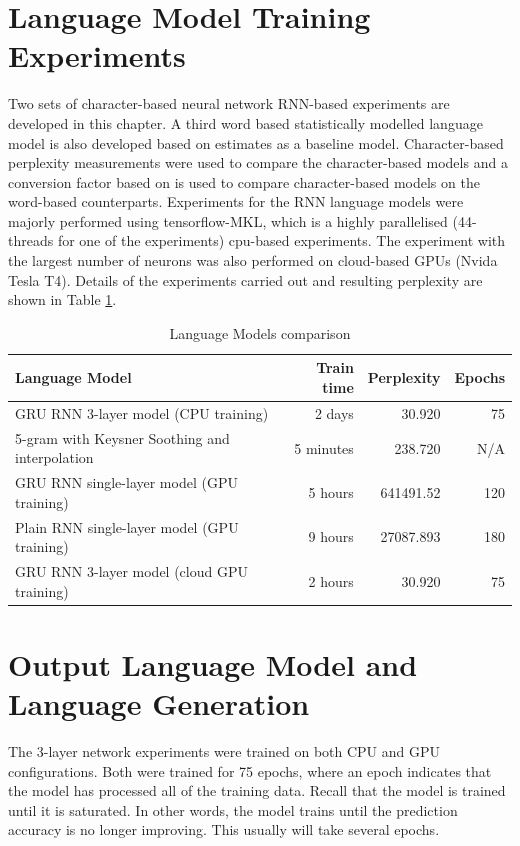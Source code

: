 \section{Language Model Training Experiments}
Two sets of character-based neural network RNN-based experiments are developed in this chapter.  A third word based statistically modelled language model is also developed based on  \cite{Heafield-estimate} estimates as a baseline model. Character-based perplexity measurements were used to compare the character-based models and a conversion factor based on \citep{hwang2017character} is used to compare character-based models on the word-based counterparts.  Experiments for the RNN language models were majorly performed using tensorflow-MKL, which is a highly parallelised (44-threads for one of the experiments) cpu-based experiments.  The experiment with the largest number of neurons was also performed on cloud-based GPUs (Nvida Tesla T4).  Details of the experiments carried out and resulting perplexity are shown in Table \ref{tab6_1:LMX}.

\begin{table}
  \caption{Language Models comparison}
  \label{tab6_1:LMX}
\begin{tabular}{lrrr}
\toprule
Language Model & Train time & Perplexity & Epochs  \\
\midrule
GRU RNN 3-layer model (CPU training) & ~ 2 days & 30.920 & 75 \\
5-gram with Keysner Soothing and interpolation & 5 minutes & 238.720 & N/A \\
GRU RNN single-layer model (GPU training) & ~ 5 hours & 641491.52 & 120 \\
Plain RNN single-layer model (GPU training) & ~ 9 hours & 27087.893 & 180 \\
GRU RNN 3-layer model (cloud GPU training) & ~ 2 hours & 30.920 & 75 \\
\bottomrule
\end{tabular}
\end{table}




\section{Output Language Model and Language Generation}\label{sec6_4}

The 3-layer network experiments were trained on both CPU and GPU configurations. Both were trained for 75 epochs, where an epoch indicates that the model has processed all of the training data.  Recall that the model  is trained until it is saturated.  In other words, the model trains until the prediction accuracy is no longer improving.   This usually will take several epochs.

